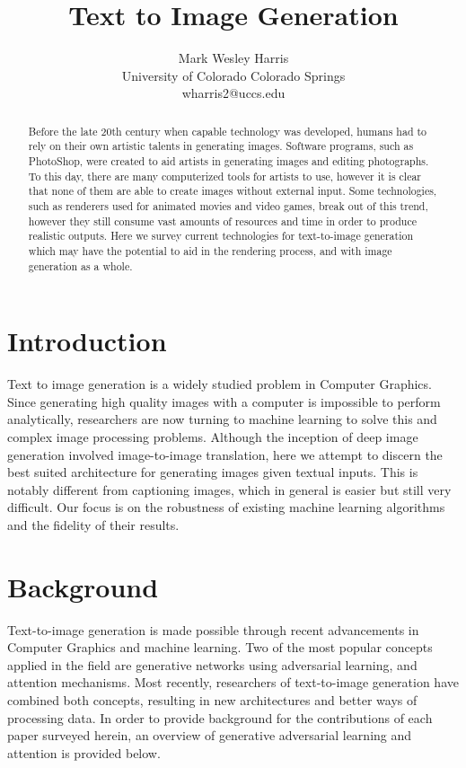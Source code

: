 \documentclass[letterpaper]{article} %
\title{Text to Image Generation}
\author{Mark Wesley Harris\\
University of Colorado Colorado Springs\\
wharris2@uccs.edu
}
\begin{document}
\maketitle

\begin{abstract}
Before the late 20th century when capable technology was developed, humans had 
to rely on their own artistic talents in generating images.
Software programs, such as PhotoShop, were created to aid artists in generating 
images and editing photographs.
To this day, there are many computerized tools for artists to use, however it 
is clear that none of them are able to create images without external input. 
Some technologies, such as renderers used for animated movies and video games, 
break out of this trend, however they still consume vast amounts of resources 
and time in order to produce realistic outputs. Here we survey current 
technologies for text-to-image generation which may have the potential to aid 
in the rendering process, and with image generation as a whole.
\end{abstract}

\section{Introduction}
\label{sec:introduction}
Text to image generation is a widely studied problem in Computer Graphics. 
Since generating high quality images with a computer is impossible 
to perform analytically, researchers are now turning to machine learning to 
solve this and complex image processing problems.
Although the inception of deep image generation involved image-to-image 
translation, here we attempt to discern the best suited architecture for 
generating images given textual inputs. This is notably different from 
captioning images, which in general is easier but still very difficult. Our 
focus is on the robustness of existing machine learning algorithms and the 
fidelity of their results.

\section{Background}
Text-to-image generation is made possible through recent advancements in 
Computer Graphics and machine learning.
Two of the most popular concepts applied in the field are generative networks 
using adversarial learning, and attention mechanisms.
Most recently, researchers of text-to-image generation 
have combined both concepts, resulting in new architectures and better ways of 
processing data. In order to provide background for the contributions of each 
paper surveyed herein, an overview of generative adversarial learning and 
attention is provided below.
\end{document}
